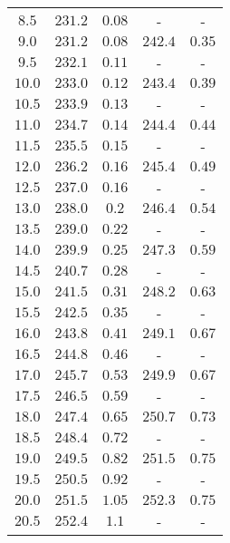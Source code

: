 \begin{table}
\begin{tabular}{c c c c c}
        $\num{8.5}$&$\num{231.2}$&$\num{0.08}$&-&-\\
        $\num{9.0}$&$\num{231.2}$&$\num{0.08}$&$\num{242.4}$&$\num{0.35}$\\
        $\num{9.5}$&$\num{232.1}$&$\num{0.11}$&-&-\\
        $\num{10.0}$&$\num{233.0}$&$\num{0.12}$&$\num{243.4}$&$\num{0.39}$\\
        $\num{10.5}$&$\num{233.9}$&$\num{0.13}$&-&-\\
        $\num{11.0}$&$\num{234.7}$&$\num{0.14}$&$\num{244.4}$&$\num{0.44}$\\
        $\num{11.5}$&$\num{235.5}$&$\num{0.15}$&-&-\\
        $\num{12.0}$&$\num{236.2}$&$\num{0.16}$&$\num{245.4}$&$\num{0.49}$\\
        $\num{12.5}$&$\num{237.0}$&$\num{0.16}$&-&-\\
        $\num{13.0}$&$\num{238.0}$&$\num{0.2}$&$\num{246.4}$&$\num{0.54}$\\
        $\num{13.5}$&$\num{239.0}$&$\num{0.22}$&-&-\\
        $\num{14.0}$&$\num{239.9}$&$\num{0.25}$&$\num{247.3}$&$\num{0.59}$\\
        $\num{14.5}$&$\num{240.7}$&$\num{0.28}$&-&-\\
        $\num{15.0}$&$\num{241.5}$&$\num{0.31}$&$\num{248.2}$&$\num{0.63}$\\
        $\num{15.5}$&$\num{242.5}$&$\num{0.35}$&-&-\\
        $\num{16.0}$&$\num{243.8}$&$\num{0.41}$&$\num{249.1}$&$\num{0.67}$\\
        $\num{16.5}$&$\num{244.8}$&$\num{0.46}$&-&-\\
        $\num{17.0}$&$\num{245.7}$&$\num{0.53}$&$\num{249.9}$&$\num{0.67}$\\
        $\num{17.5}$&$\num{246.5}$&$\num{0.59}$&-&-\\
        $\num{18.0}$&$\num{247.4}$&$\num{0.65}$&$\num{250.7}$&$\num{0.73}$\\
        $\num{18.5}$&$\num{248.4}$&$\num{0.72}$&-&-\\
        $\num{19.0}$&$\num{249.5}$&$\num{0.82}$&$\num{251.5}$&$\num{0.75}$\\
        $\num{19.5}$&$\num{250.5}$&$\num{0.92}$&-&-\\
        $\num{20.0}$&$\num{251.5}$&$\num{1.05}$&$\num{252.3}$&$\num{0.75}$\\
        $\num{20.5}$&$\num{252.4}$&$\num{1.1}$&-&-\\

\end{tabular}
\end{table}

